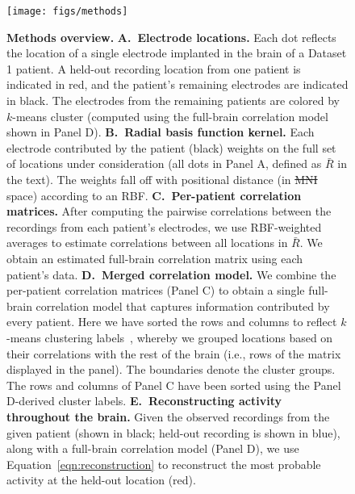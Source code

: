 \documentclass[11pt]{article}
\providecommand{\DIFaddtex}[1]{{\protect\color{blue}\uwave{#1}}} %
\providecommand{\DIFdeltex}[1]{{\protect\color{red}\sout{#1}}}                      %
\providecommand{\DIFaddFL}[1]{\DIFadd{#1}} %
\providecommand{\DIFdelFL}[1]{\DIFdel{#1}} %
\providecommand{\DIFaddbeginFL}{} %
\providecommand{\DIFaddendFL}{} %
\providecommand{\DIFdelbeginFL}{} %
\providecommand{\DIFdelendFL}{} %
\providecommand{\DIFadd}[1]{\texorpdfstring{\DIFaddtex{#1}}{#1}} %
\providecommand{\DIFdel}[1]{\texorpdfstring{\DIFdeltex{#1}}{}} %
\newcommand{\DIFscaledelfig}{0.5}
\newlength{\DIFdelgraphicswidth} %
\newlength{\DIFdelgraphicsheight} %
\newcommand{\DIFaddincludegraphics}[2][]{{\color{blue}\fbox{\DIFOincludegraphics[#1]{#2}}}} %
\newcommand{\DIFdelincludegraphics}[2][]{%
\sbox{\DIFdelgraphicsbox}{\DIFOincludegraphics[#1]{#2}}%
\settoboxwidth{\DIFdelgraphicswidth}{\DIFdelgraphicsbox} %
\settoboxtotalheight{\DIFdelgraphicsheight}{\DIFdelgraphicsbox} %
\scalebox{\DIFscaledelfig}{%
\parbox[b]{\DIFdelgraphicswidth}{\usebox{\DIFdelgraphicsbox}\\[-\baselineskip] \rule{\DIFdelgraphicswidth}{0em}}\llap{\resizebox{\DIFdelgraphicswidth}{\DIFdelgraphicsheight}{%
\setlength{\unitlength}{\DIFdelgraphicswidth}%
\begin{picture}(1,1)%
\thicklines\linethickness{2pt} %
{\color[rgb]{1,0,0}\put(0,0){\framebox(1,1){}}}%
{\color[rgb]{1,0,0}\put(0,0){\line( 1,1){1}}}%
{\color[rgb]{1,0,0}\put(0,1){\line(1,-1){1}}}%
\end{picture}%
}\hspace*{3pt}}} %
} %
\DeclareRobustCommand{\DIFaddbeginFL}{\DIFOaddbeginFL \let\includegraphics\DIFaddincludegraphics} %
\DeclareRobustCommand{\DIFaddendFL}{\DIFOaddendFL \let\includegraphics\DIFOincludegraphics} %
\DeclareRobustCommand{\DIFdelbeginFL}{\DIFOdelbeginFL \let\includegraphics\DIFdelincludegraphics} %
\DeclareRobustCommand{\DIFdelendFL}{\DIFOaddendFL \let\includegraphics\DIFOincludegraphics} %
\begin{document}
\begin{figure}
  \centering \texttt{[image: figs/methods]}
  \caption{\textbf{Methods overview.}  \textbf{A.~Electrode locations.}  Each
  dot reflects the location of a single electrode implanted in the brain of a
  Dataset 1 patient.  A held-out recording location from one patient is
  indicated in red, and the patient's remaining electrodes are indicated in
  black. The electrodes from the remaining patients are colored by $k$-means
  cluster (computed using the full-brain correlation model shown in Panel D).
  \textbf{B.~Radial basis function kernel.} Each electrode contributed by the
  patient (black) weights on the full set of locations under consideration (all
  dots in Panel A, defined as \DIFdelbeginFL \DIFdelFL{$\bar{R}$ }\DIFdelendFL \DIFaddbeginFL \DIFaddFL{$\overline{R}$ }\DIFaddendFL in the text).  The weights fall off with
  positional distance (in \DIFdelbeginFL \DIFdelFL{MNI }\DIFdelendFL \DIFaddbeginFL \DIFaddFL{MNI152 }\DIFaddendFL space) according to an RBF. \textbf{C.~Per-patient
  correlation matrices.}  After computing the pairwise correlations between the
  recordings from each patient's electrodes, we use RBF-weighted averages to
  estimate correlations between all locations in \DIFdelbeginFL \DIFdelFL{$\bar{R}$}\DIFdelendFL \DIFaddbeginFL \DIFaddFL{$\overline{R}$}\DIFaddendFL .  We obtain an
  estimated full-brain correlation matrix using each patient's data.
  \textbf{D.~Merged correlation model.}  We combine the per-patient correlation
  matrices (Panel C) to obtain a single full-brain correlation model that
  captures information contributed by every patient.  Here we have sorted the
  rows and columns to reflect $k$-means clustering labels~\citep[using
  $k$=7;][]{YeoEtal11}, whereby we grouped locations based on their correlations
  with the rest of the brain (i.e., rows of the matrix displayed in the panel).
  The boundaries denote the cluster groups.  The rows and columns of Panel C
  have been sorted using the Panel D-derived cluster labels.
  \textbf{E.~Reconstructing activity throughout the brain.}  Given the observed
  recordings from the given patient (shown in black; held-out recording is shown
  in blue), along with a full-brain correlation model (Panel D), we use
  Equation~\ref{eqn:reconstruction} to reconstruct the most probable activity at
  the held-out location (red).} \label{fig:methods}
\end{figure}
\end{document}
